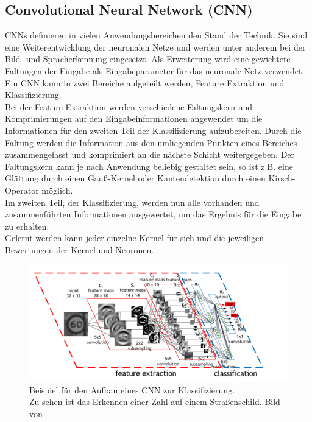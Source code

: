 \subsection{Convolutional Neural Network (CNN)}
CNNs definieren in vielen Anwendungsbereichen den Stand der Technik. Sie sind eine Weiterentwicklung der neuronalen Netze und werden unter anderem bei der Bild- und Spracherkennung eingesetzt. Als Erweiterung wird eine gewichtete Faltungen der Eingabe als Eingabeparameter für das neuronale Netz verwendet.\\
Ein CNN kann in zwei Bereiche aufgeteilt werden, Feature Extraktion und Klassifizierung.\\
Bei der Feature Extraktion werden verschiedene Faltungskern und Komprimierungen auf den Eingabeinformationen angewendet um die Informationen für den zweiten Teil der Klassifizierung aufzubereiten. Durch die Faltung werden die Information aus den umliegenden Punkten eines Bereiches zusammengefasst und komprimiert an die nächste Schicht weitergegeben. Der Faltungskern kann je nach Anwendung beliebig gestaltet sein, so ist z.B. eine Glättung durch einen Gauß-Kernel oder Kantendetektion durch einen Kirsch-Operator möglich.\\
Im zweiten Teil, der Klassifizierung, werden nun alle vorhanden und zusammenführten Informationen ausgewertet, um das Ergebnis für die Eingabe zu erhalten.\\
Gelernt werden kann jeder einzelne Kernel für sich und die jeweiligen Bewertungen der Kernel und Neuronen.
\cite{pdf_CNN}\cite{wiki_CNN}
\begin{figure}
	\centering
	\includegraphics[width=0.9\linewidth]{img/cnn}
	\caption{Beispiel für den Aufbau eines CNN zur Klassifizierung.\\Zu sehen ist das Erkennen einer Zahl auf einem Straßenschild. Bild von \cite{bild_CNN}}
	\label{img_cnn}
\end{figure}

